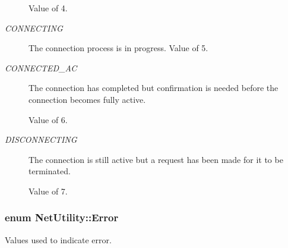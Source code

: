 \begin{Desc}
\begin{description}
 Value of 4. \item[{\em 
\hypertarget{class_net_utility_a7eae52138f8bd597ffc67ebf07e86b6da9d19ff7a0b7766eb4176922a19ff44af}{
CONNECTING}
\label{class_net_utility_a7eae52138f8bd597ffc67ebf07e86b6da9d19ff7a0b7766eb4176922a19ff44af}
}]The connection process is in progress. Value of 5. \item[{\em 
\hypertarget{class_net_utility_a7eae52138f8bd597ffc67ebf07e86b6da7b6f70df4b1b357e16aee1e4ca169aa2}{
CONNECTED\_\-AC}
\label{class_net_utility_a7eae52138f8bd597ffc67ebf07e86b6da7b6f70df4b1b357e16aee1e4ca169aa2}
}]The connection has completed but confirmation is needed before the connection becomes fully active. \par
 Value of 6. \item[{\em 
\hypertarget{class_net_utility_a7eae52138f8bd597ffc67ebf07e86b6da9a6a615b574b5d529729238b1d956ee6}{
DISCONNECTING}
\label{class_net_utility_a7eae52138f8bd597ffc67ebf07e86b6da9a6a615b574b5d529729238b1d956ee6}
}]The connection is still active but a request has been made for it to be terminated. \par
 Value of 7. \end{description}
\end{Desc}

\hypertarget{class_net_utility_ae331fb5c7488331b51a881f5e5435ce7}{
\subsubsection[{Error}]{\setlength{\rightskip}{0pt plus 5cm}enum {\bf NetUtility::Error}}}
\label{class_net_utility_ae331fb5c7488331b51a881f5e5435ce7}


Values used to indicate error. 

